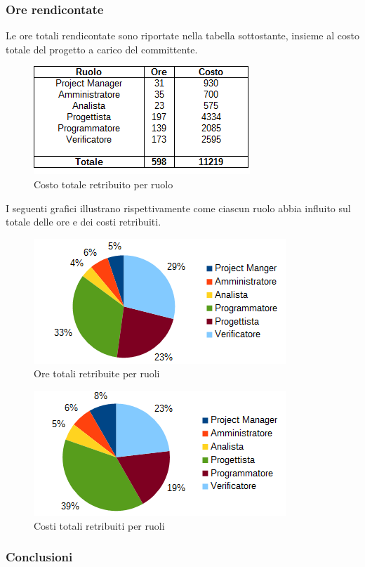 		\subsubsection{Ore rendicontate}
		Le ore totali rendicontate sono riportate nella tabella sottostante, insieme al costo totale del progetto a carico del committente. \\
		\begin{figure}[H]
			\centering
			\includegraphics[scale=0.75]{immagini/tabelle/orario_rendicontato-costo.png}
			\caption{Costo totale retribuito per ruolo}
		\end{figure}
		I seguenti grafici illustrano rispettivamente come ciascun ruolo abbia influito sul totale delle ore e dei costi retribuiti. \\
		\begin{figure}[H]
		\centering
			\includegraphics[scale=1]{immagini/grafici/orario_rendicontato-torta.png}
			\caption{Ore totali retribuite per ruoli}
		\end{figure}
		\begin{figure}[H]
			\centering
			\includegraphics[scale=1]{immagini/grafici/orario_rendicontato-torta-costo.png}
			\caption{Costi totali retribuiti per ruoli}
		\end{figure}
		\subsubsection{Conclusioni}